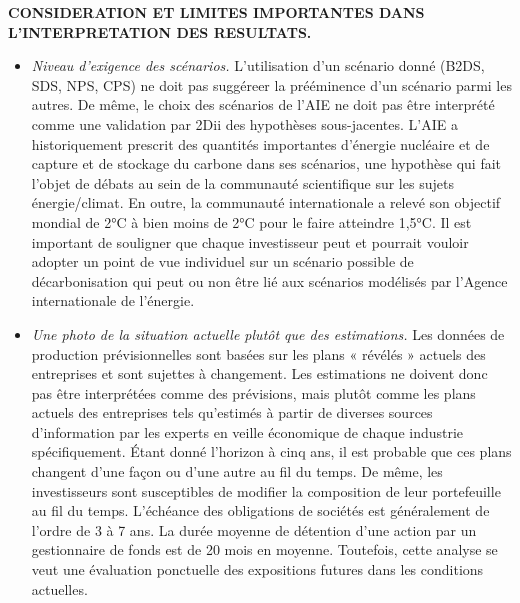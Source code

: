 \documentclass[10pt,table,a4]{article}\usepackage[]{graphicx}\usepackage[]{color}
\begin{document}
	\begin{multicols}{2}
		
		
		{\small \textbf{CONSIDERATION ET LIMITES IMPORTANTES DANS L'INTERPRETATION DES RESULTATS.}
		
	 		\begin{itemize}
			\item{\textit{Niveau d'exigence des scénarios.} L'utilisation d'un scénario donné (B2DS, SDS, NPS, CPS) ne doit pas suggéreer la prééminence d'un scénario parmi les autres. De même, le choix des scénarios de l'AIE ne doit pas être interprété comme une validation par 2Dii des hypothèses sous-jacentes. L'AIE a historiquement prescrit des quantités importantes d'énergie nucléaire et de capture et de stockage du carbone dans ses scénarios, une hypothèse qui fait l'objet de débats au sein de la communauté scientifique sur les sujets énergie/climat. En outre, la communauté internationale a relevé son objectif mondial de 2°C à bien moins de 2°C pour le faire atteindre 1,5°C. Il est important de souligner que chaque investisseur peut et pourrait vouloir adopter un point de vue individuel sur un scénario possible de décarbonisation qui peut ou non être lié aux scénarios modélisés par l'Agence internationale de l'énergie.}
			
			\item{\textit{Une photo de la situation actuelle plutôt que des estimations.} Les données de production prévisionnelles sont basées sur les plans « révélés » actuels des entreprises et sont sujettes à changement. Les estimations ne doivent donc pas être interprétées comme des prévisions, mais plutôt comme les plans actuels des entreprises tels qu'estimés à partir de diverses sources d'information par les experts en veille économique de chaque industrie spécifiquement. Étant donné l'horizon à cinq ans, il est probable que ces plans changent d'une façon ou d'une autre au fil du temps. De même, les investisseurs sont susceptibles de modifier la composition de leur portefeuille au fil du temps. L'échéance des obligations de sociétés est généralement de l'ordre de 3 à 7 ans. La durée moyenne de détention d'une action par un gestionnaire de fonds est de 20 mois en moyenne. Toutefois, cette analyse se veut une évaluation ponctuelle des expositions futures dans les conditions actuelles.}
			

\end{itemize}}
\end{multicols}
\end{document}
